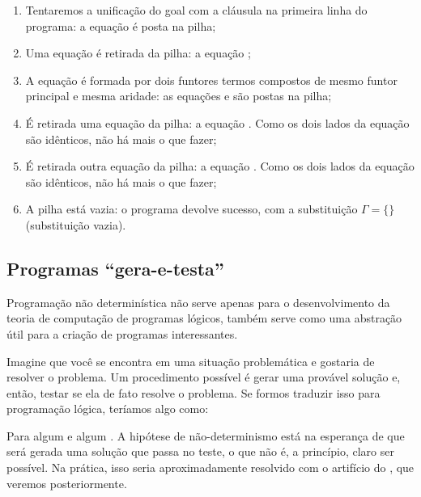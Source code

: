 \documentclass{article}
\begin{document}
  \begin{enumerate}
    \item Tentaremos a unificação do goal com a cláusula na primeira linha do programa: a equação  é posta na pilha;
    \item Uma equação é retirada da pilha: a equação ;
    \item A equação é formada por dois funtores termos compostos de mesmo funtor principal e mesma aridade: as equações  e  são postas na pilha;
    \item É retirada uma equação da pilha: a equação . Como os dois lados da equação são idênticos, não há mais o que fazer;
    \item É retirada outra equação da pilha: a equação . Como os dois lados da equação são idênticos, não há mais o que fazer;
    \item A pilha está vazia: o programa devolve sucesso, com a substituição $\Gamma = \{\}$ (substituição vazia).
  \end{enumerate}


  \subsection{Programas ``gera-e-testa''}

  Programação não determinística não serve apenas para o desenvolvimento da teoria de computação de programas lógicos, também serve como uma abstração útil para a criação de programas interessantes.

  Imagine que você se encontra em uma situação problemática e gostaria de resolver o problema. Um procedimento possível é gerar uma provável solução e, então, testar se ela de fato resolve o problema. Se formos traduzir isso para programação lógica, teríamos algo como:



Para algum  e algum . A hipótese de não-determinismo está na esperança de que será gerada uma solução que passa no teste, o que não é, a princípio, claro ser possível. Na prática, isso seria aproximadamente resolvido com o artifício do , que veremos posteriormente.
\end{document}
